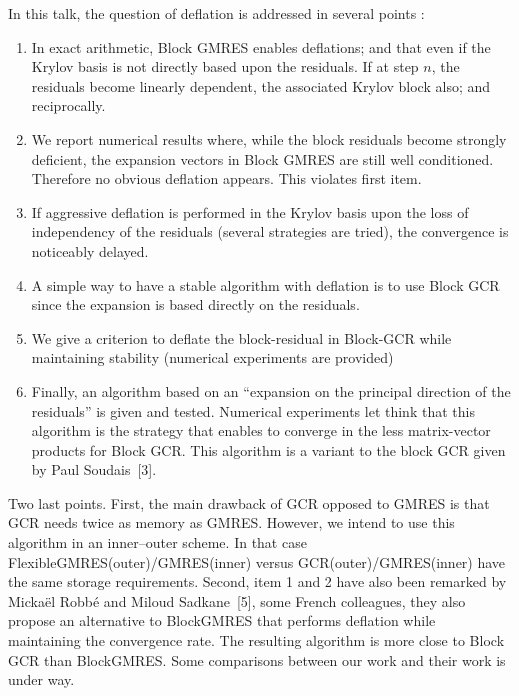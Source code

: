 \documentclass{report}
\begin{document}
In this talk, the question of deflation is addressed in several points :
\begin{enumerate}
\item
In exact arithmetic, Block GMRES enables deflations; and that
even if the Krylov basis is not directly based upon the residuals.
If at step $n$, the residuals
become linearly dependent, the associated Krylov block also; and reciprocally.
\item
We report numerical results where, while the block residuals become strongly deficient,
the expansion vectors in Block GMRES are still well conditioned.
Therefore no obvious deflation appears.
This violates first item.
\item
If aggressive deflation is performed in the Krylov basis upon the loss of
independency of the residuals (several strategies are tried),
the convergence is noticeably delayed.
\item
A simple way to have a stable algorithm with deflation is to use Block GCR
since the expansion is based directly on the residuals.
\item
We give a criterion to deflate the block-residual in Block-GCR while
maintaining stability (numerical experiments are provided)
\item
Finally, an algorithm based on an ``expansion on the principal direction
of the residuals'' is given and tested.
Numerical experiments let think that this algorithm is the strategy that enables
to converge in the less matrix-vector products for Block GCR. This
algorithm is a variant to the block GCR given by Paul Soudais~[3].
\end{enumerate}

Two last points. First, the main drawback of GCR opposed to GMRES is that
GCR needs twice as memory as GMRES. However,
we intend to use this algorithm in an inner--outer scheme. In that case
FlexibleGMRES(outer)/GMRES(inner)
versus GCR(outer)/GMRES(inner) have the same storage requirements.
Second, item 1 and 2 have also been remarked by Micka\"el Robb\'e and
Miloud Sadkane~[5], some French colleagues,
they also propose an alternative to BlockGMRES
that performs deflation while maintaining the convergence rate. The
resulting algorithm is more close
to Block GCR than BlockGMRES. Some comparisons between our work and their
work is under way.
\end{document}
